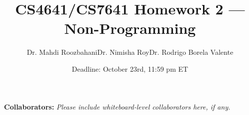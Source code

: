 \documentclass{article}
\title{CS4641/CS7641 Homework 2 — Non-Programming}
\author{Dr. Mahdi Roozbahani\hspace{2cm}Dr. Nimisha Roy\hspace{2cm}Dr. Rodrigo Borela Valente}
\date{Deadline: October 23rd, 11:59 pm ET}
\begin{document}
\maketitle

\textbf{Collaborators:} \textit{Please include whiteboard-level collaborators here, if any.}
\newpage


\newpage


\newpage














\end{document}
